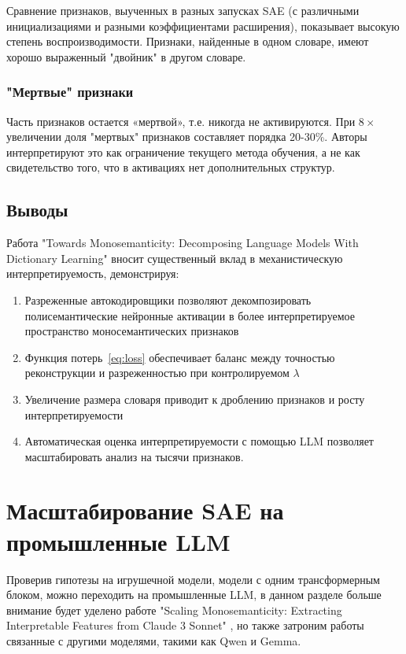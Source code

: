 \documentclass[a4paper,14pt]{extreport}
\begin{document}
Сравнение признаков, выученных в разных запусках SAE (с различными инициализациями и
разными коэффициентами расширения), показывает высокую степень воспроизводимости.
Признаки, найденные в одном словаре, имеют хорошо выраженный "двойник" в другом словаре.

\subsubsection{"Мертвые" признаки}

Часть признаков остается «мертвой», т.е. никогда не активируются. При $8\times$ увеличении
доля "мертвых" признаков составляет порядка 20-30\%. Авторы интерпретируют это как ограничение текущего метода обучения,
а не как свидетельство того, что в активациях нет дополнительных структур.

\subsection{Выводы}

Работа "Towards Monosemanticity: Decomposing Language Models With Dictionary Learning" вносит существенный вклад в механистическую
интерпретируемость, демонстрируя:
\begin{enumerate}
    \item Разреженные автокодировщики позволяют декомпозировать полисемантические
          нейронные активации в более интерпретируемое пространство моносемантических признаков
    \item Функция потерь~\eqref{eq:loss} обеспечивает баланс между точностью реконструкции
          и разреженностью при контролируемом $\lambda$
    \item Увеличение размера словаря приводит к дроблению признаков и росту
          интерпретируемости
    \item Автоматическая оценка интерпретируемости с помощью LLM
          позволяет масштабировать анализ на тысячи признаков.
\end{enumerate}

\section{Масштабирование SAE на промышленные LLM}

Проверив гипотезы на игрушечной модели, модели с одним трансформерным блоком,
можно переходить на промышленные LLM, в данном разделе больше внимание будет уделено 
работе "Scaling Monosemanticity: Extracting Interpretable Features from Claude 3 Sonnet" 
\cite{templeton2024scaling}, но также затроним работы связанные с другими моделями, 
такими как Qwen и Gemma.
\end{document}
